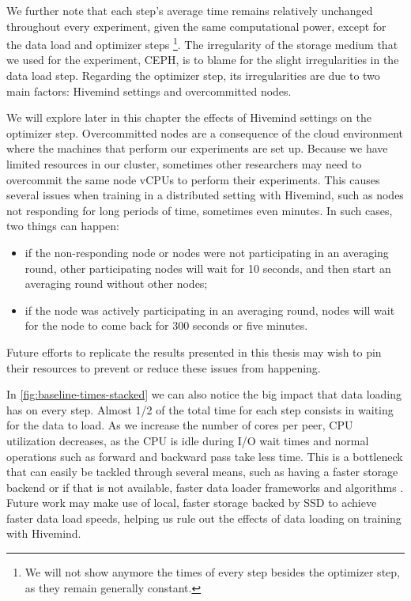 We further note that each step's average time remains relatively unchanged throughout every experiment, given the same computational power, except for the data load and optimizer steps
\footnote{We will not show anymore the times of every step besides the optimizer step, as they remain generally constant.}.
The irregularity of the storage medium that we used for the experiment, CEPH, is to blame for the slight irregularities in the data load step.
Regarding the optimizer step, its irregularities are due to two main factors: Hivemind settings and overcommitted nodes.

We will explore later in this chapter the effects of Hivemind settings on the optimizer step.
Overcommitted nodes are a consequence of the cloud environment where the machines that perform our experiments are set up.
Because we have limited resources in our cluster, sometimes other researchers may need to overcommit the same node vCPUs to perform their experiments.
This causes several issues when training in a distributed setting with Hivemind, such as nodes not responding for long periods of time, sometimes even minutes.
In such cases, two things can happen:

\begin{itemize}
    \item if the non-responding node or nodes were not participating in an averaging round, other participating nodes will wait for 10 seconds, and then start an averaging round without other nodes;
    \item if the node was actively participating in an averaging round, nodes will wait for the node to come back for 300 seconds or five minutes.
\end{itemize}

Future efforts to replicate the results presented in this thesis may wish to pin their resources to prevent or reduce these issues from happening.

In \autoref{fig:baseline-times-stacked} we can also notice the big impact that data loading has on every step.
Almost 1/2 of the total time for each step consists in waiting for the data to load.
As we increase the number of cores per peer, CPU utilization decreases, as the CPU is idle during I/O wait times and normal operations such as forward and backward pass take less time.
This is a bottleneck that can easily be tackled through several means, such as having a faster storage backend or if that is not available, faster data loader frameworks and algorithms \cite{isenko2022bottleneck, leclerc2022ffcv}.
Future work may make use of local, faster storage backed by SSD to achieve faster data load speeds, helping us rule out the effects of data loading on training with Hivemind.

